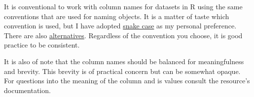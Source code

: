 \documentclass[
  letterpaper,
]{latex/krantz}
\begin{document}
\begin{tcolorbox}[enhanced jigsaw, toprule=.15mm, bottomtitle=1mm, coltitle=black, title=\textcolor{quarto-callout-warning-color}{\faExclamationTriangle}\hspace{0.5em}{Tip}, left=2mm, colframe=quarto-callout-warning-color-frame, bottomrule=.15mm, colbacktitle=quarto-callout-warning-color!10!white, leftrule=.75mm, colback=white, titlerule=0mm, breakable, toptitle=1mm, opacityback=0, arc=.35mm, rightrule=.15mm, opacitybacktitle=0.6]

It is conventional to work with column names for datasets in R using the
same conventions that are used for naming objects. It is a matter of
taste which convention is used, but I have adopted
\href{https://bookdown.org/content/d1e53ac9-28ce-472f-bc2c-f499f18264a3/names.html\#snake_case}{snake
case} as my personal preference. There are also
\href{https://bookdown.org/content/d1e53ac9-28ce-472f-bc2c-f499f18264a3/names.html}{alternatives}.
Regardless of the convention you choose, it is good practice to be
consistent.

It is also of note that the column names should be balanced for
meaningfulness and brevity. This brevity is of practical concern but can
be somewhat opaque. For questions into the meaning of the column and is
values consult the resource's documentation.

\end{tcolorbox}
\end{document}
